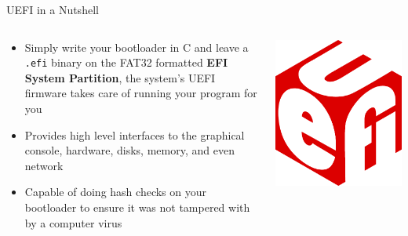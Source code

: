 \documentclass{lug}
\begin{document}
\begin{frame}{UEFI in a Nutshell}
    \begin{columns}
        \begin{column}{0.7\textwidth}
            \begin{itemize}[<+->]
                \item Simply write your bootloader in C and leave a \texttt{.efi}
                    binary on the FAT32 formatted \textbf{EFI System Partition}, the
                    system's UEFI firmware takes care of running your program for you
                \item Provides high level interfaces to the graphical console,
                    hardware, disks, memory, and even network
                \item Capable of doing hash checks on your bootloader to ensure it was
                    not tampered with by a computer virus
            \end{itemize}
        \end{column}
        \begin{column}{0.3\textwidth}
            \includegraphics[width=\textwidth]{graphics/uefi}
        \end{column}
    \end{columns}
\end{frame}
\end{document}

